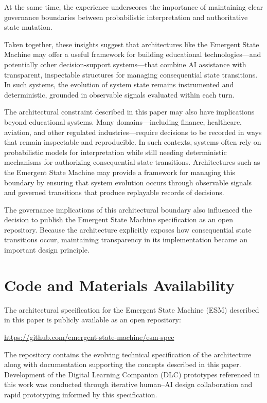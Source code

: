 \documentclass[11pt]{article}
\begin{document}
At the same time, the experience underscores the importance of maintaining clear governance boundaries between probabilistic interpretation and authoritative state mutation.

Taken together, these insights suggest that architectures like the Emergent State Machine may offer a useful framework for building educational technologies—and potentially other decision-support systems—that combine AI assistance with transparent, inspectable structures for managing consequential state transitions. In such systems, the evolution of system state remains instrumented and deterministic, grounded in observable signals evaluated within each turn.

The architectural constraint described in this paper may also have implications beyond educational systems. Many domains—including finance, healthcare, aviation, and other regulated industries—require decisions to be recorded in ways that remain inspectable and reproducible. In such contexts, systems often rely on probabilistic models for interpretation while still needing deterministic mechanisms for authorizing consequential state transitions. Architectures such as the Emergent State Machine may provide a framework for managing this boundary by ensuring that system evolution occurs through observable signals and governed transitions that produce replayable records of decisions.

The governance implications of this architectural boundary also influenced the decision to publish the Emergent State Machine specification as an open repository. Because the architecture explicitly exposes how consequential state transitions occur, maintaining transparency in its implementation became an important design principle.

\section*{Code and Materials Availability}

The architectural specification for the Emergent State Machine (ESM) described in this paper is publicly available as an open repository:

\url{https://github.com/emergent-state-machine/esm-spec}

The repository contains the evolving technical specification of the architecture along with documentation supporting the concepts described in this paper. Development of the Digital Learning Companion (DLC) prototypes referenced in this work was conducted through iterative human–AI design collaboration and rapid prototyping informed by this specification.



\end{document}
